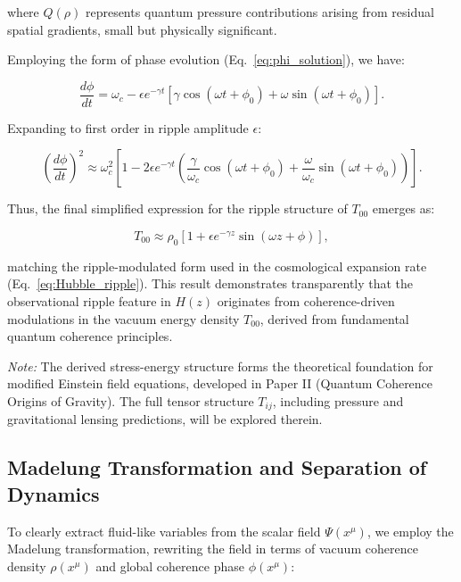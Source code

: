 where \( Q(\rho) \) represents quantum pressure contributions arising from residual spatial gradients, small but physically significant.

Employing the form of phase evolution (Eq.~\eqref{eq:phi_solution}), we have:

\begin{equation}
\frac{d\phi}{dt} = \omega_c - \epsilon e^{-\gamma t}\left[\gamma\cos(\omega t + \phi_0) + \omega\sin(\omega t + \phi_0)\right].
\label{eq:phase_modulation_derivative_1}
\end{equation}

Expanding to first order in ripple amplitude \(\epsilon\):

\begin{equation}
\left(\frac{d\phi}{dt}\right)^2 \approx \omega_c^2\left[1 - 2\epsilon e^{-\gamma t}\left(\frac{\gamma}{\omega_c}\cos(\omega t + \phi_0) + \frac{\omega}{\omega_c}\sin(\omega t + \phi_0)\right)\right].
\end{equation}

Thus, the final simplified expression for the ripple structure of \(T_{00}\) emerges as:

\begin{equation}
T_{00} \approx \rho_0\left[1 + \epsilon e^{-\gamma z}\sin(\omega z + \phi)\right],
\label{eq:t00_ripple_final}
\end{equation}

matching the ripple-modulated form used in the cosmological expansion rate (Eq.~\eqref{eq:Hubble_ripple}). This result demonstrates transparently that the observational ripple feature in \(H(z)\) originates from coherence-driven modulations in the vacuum energy density \(T_{00}\), derived from fundamental quantum coherence principles.

\textit{Note:} The derived stress-energy structure forms the theoretical foundation for modified Einstein field equations, developed in Paper II (Quantum Coherence Origins of Gravity). The full tensor structure \(T_{ij}\), including pressure and gravitational lensing predictions, will be explored therein.

\subsection{Madelung Transformation and Separation of Dynamics}

To clearly extract fluid-like variables from the scalar field \(\Psi(x^\mu)\), we employ the Madelung transformation, rewriting the field in terms of vacuum coherence density \(\rho(x^\mu)\) and global coherence phase \(\phi(x^\mu)\):

